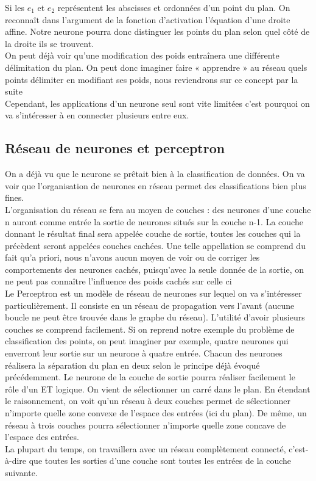 Si les $e_1$ et $e_2$ représentent les abscisses et ordonnées d’un point du plan. On reconnaît dans l’argument de la fonction d’activation l’équation d’une droite affine. Notre neurone pourra donc distinguer les points du plan selon quel côté de la droite ils se trouvent.\\

On peut déjà voir qu’une modification des poids entraînera une différente délimitation du plan. On peut donc imaginer faire « apprendre » au réseau quels points délimiter en modifiant ses poids, nous reviendrons sur ce concept par la suite\\
Cependant, les applications d’un neurone seul sont vite limitées c’est pourquoi on va s’intéresser à en connecter plusieurs entre eux.\\

\subsection{Réseau de neurones et perceptron} %
\label{sub:reseau_de_neurones}
On a déjà vu que le neurone se prêtait bien à la classification de données. On va voir que l’organisation de neurones en réseau permet des classifications bien plus fines.\\
L’organisation du réseau se fera au moyen de couches : des neurones d’une couche n auront comme entrée la sortie de neurones situés sur la couche n-1. La couche donnant le résultat final sera appelée couche de sortie, toutes les couches qui la précèdent seront appelées couches cachées. Une telle appellation se comprend du fait qu’a priori, nous n’avons aucun moyen de voir ou de corriger les comportements des neurones cachés, puisqu’avec la seule donnée de la sortie, on ne peut pas connaître l’influence des poids cachés sur celle ci\\

Le Perceptron est un modèle de réseau de neurones sur lequel on va s’intéresser particulièrement. Il consiste en un réseau de propagation vers l’avant (aucune boucle ne peut être trouvée dans le graphe du réseau).
L’utilité d’avoir plusieurs couches se comprend facilement. Si on reprend notre exemple du problème de classification des points, on peut imaginer par exemple, quatre neurones qui enverront leur sortie sur un neurone à quatre entrée. Chacun des neurones réalisera la séparation du plan en deux selon le principe déjà évoqué précédemment. Le neurone de la couche de sortie pourra réaliser facilement le rôle d’un ET logique. On vient de sélectionner un carré dans le plan. En étendant le raisonnement, on voit qu’un réseau à deux couches permet de sélectionner n’importe quelle zone convexe de l’espace des entrées (ici du plan). De même, un réseau à trois couches pourra sélectionner n’importe quelle zone concave de l’espace des entrées.\\
La plupart du temps, on travaillera avec un réseau complètement connecté, c’est-à-dire que toutes les sorties d’une couche sont toutes les entrées de la couche suivante.

